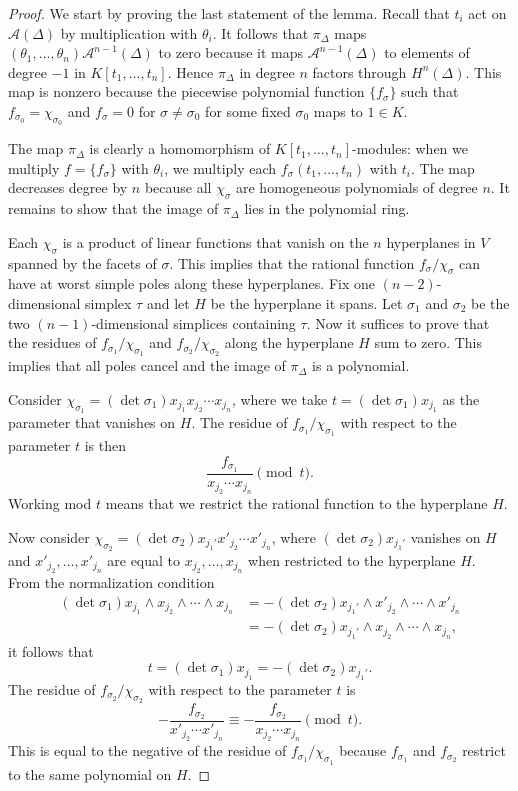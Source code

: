 \documentclass[10pt]{article}
\theoremstyle{definition}
\newcommand{\cA}{{\mathcal A}}
\begin{document}
\begin{proof}
We start by proving the last statement of the lemma. Recall that $t_i$ act on $\cA(\Delta)$ by multiplication with $\theta_i$. It follows that $\pi_{\Delta}$ maps $(\theta_1,\ldots,\theta_n) \cA^{n-1}(\Delta)$ to zero because it maps $\cA^{n-1}(\Delta)$ to elements of degree $-1$ in $K[t_1,\ldots, t_n]$. Hence $\pi_{\Delta}$ in degree $n$ factors through $H^n(\Delta)$. This map is nonzero because the piecewise polynomial function $\{ f_\sigma\}$ such that $f_{\sigma_0} = \chi_{\sigma_0}$ and $f_\sigma=0$ for $\sigma\neq \sigma_0$ for some fixed $\sigma_0$ maps to $1\in K$.

The map $\pi_{\Delta}$ is clearly a homomorphism of $K[t_1,\ldots, t_n]$-modules: when we multiply $f= \{f_\sigma \}$ with $\theta_i$, we multiply each $f_\sigma(t_1,\ldots,t_n)$ with $t_i$. The map decreases degree by $n$ because all $\chi_\sigma$ are homogeneous polynomials of degree $n$. It remains to show that the image of $\pi_{\Delta}$ lies in the polynomial ring.

Each $\chi_\sigma$ is a product of linear functions that vanish on the $n$ hyperplanes in $V$ spanned by the facets of $\sigma$. This implies that the rational function $f_\sigma/\chi_\sigma$ can have at worst simple poles along these hyperplanes. Fix one $(n-2)$-dimensional simplex $\tau$ and let $H$ be the hyperplane it spans. Let $\sigma_1$ and $\sigma_2$ be the two $(n-1)$-dimensional simplices containing $\tau$. Now it suffices to prove that the residues of  $f_{\sigma_1}/\chi_{\sigma_1}$ and $f_{\sigma_2}/\chi_{\sigma_2}$ along the hyperplane $H$ sum to zero. This implies that all poles cancel and the image of $\pi_{\Delta}$ is a polynomial.

Consider $\chi_{\sigma_1} =  (\det \sigma_1) x_{j_1} x_{j_2} \cdots x_{j_n}$, where we take $t=(\det \sigma_1) x_{j_1}$ as the parameter that vanishes on $H$. The residue of $f_{\sigma_1}/\chi_{\sigma_1}$ with respect to the parameter $t$ is then 
\[ \frac{f_{\sigma_1}}{x_{j_2} \cdots x_{j_n}} \pmod t.\]
Working mod $t$ means that we restrict the rational function to the hyperplane $H$.

Now consider $\chi_{\sigma_2} = (\det \sigma_2) x_{j_1'} x'_{j_2} \cdots x'_{j_n}$, where $(\det \sigma_2) x_{j_1'}$ vanishes on $H$ and $x'_{j_2}, \ldots, x'_{j_n}$ are equal to $x_{j_2}, \ldots, x_{j_n}$ when restricted to the hyperplane $H$. From the normalization condition
\begin{align*}
  (\det \sigma_1) x_{j_1}\wedge x_{j_2} \wedge \cdots \wedge x_{j_n} &= -(\det \sigma_2) x_{j_1'}\wedge x'_{j_2} \wedge \cdots \wedge x'_{j_n} \\
    &= -(\det \sigma_2) x_{j_1'}\wedge x_{j_2} \wedge \cdots \wedge x_{j_n},
\end{align*}
it follows that 
\[ t= (\det \sigma_1) x_{j_1} = - (\det \sigma_2) x_{j_1'}.\]
The residue of $f_{\sigma_2}/\chi_{\sigma_2}$ with respect to the parameter $t$ is
\[ -\frac{f_{\sigma_2}}{x'_{j_2} \cdots x'_{j_n}} \equiv - \frac{f_{\sigma_2}}{x_{j_2} \cdots x_{j_n}} \pmod t.\]
This is equal to the negative of the residue of $f_{\sigma_1}/\chi_{\sigma_1}$ because $f_{\sigma_1}$ and $f_{\sigma_2}$ restrict to the same polynomial on $H$.
\end{proof}
\end{document}
